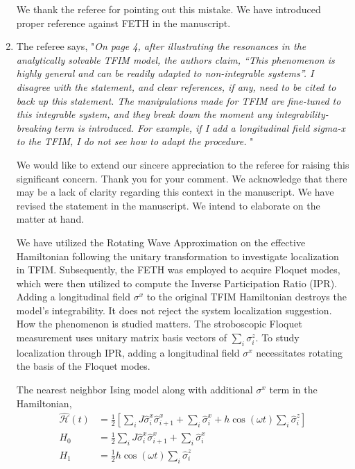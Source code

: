 \documentclass[aps,prb,reprint,showpacs,floatfix,superscriptaddress, onecolumn, nofootinbib, 9pt]{revtex4-2}
\newcommand{\response}[1]{{\color{blue}#1}} %
\begin{document}
\begin{enumerate}
\response{
We thank the referee for pointing out this mistake. We have introduced proper reference against FETH in the manuscript.
}

\item The referee says, "\textit{On page 4, after illustrating the resonances in the analytically solvable TFIM model, the authors claim, “This phenomenon is highly general and can be readily adapted to non-integrable systems”. I disagree with the statement, and clear references, if any, need to be cited to back up this statement. The manipulations made for TFIM are fine-tuned to this integrable system, and they break down the moment any integrability-breaking term is introduced. For example, if I add a longitudinal field sigma-x to the TFIM, I do not see how to adapt the procedure. }"\\

\response{ We would like to extend our sincere appreciation to the referee for raising this significant concern. Thank you for your comment. We acknowledge that there may be a lack of clarity regarding this context in the manuscript. We have revised the statement in the manuscript. We intend to elaborate on the matter at hand.

We have utilized the Rotating Wave Approximation on the effective Hamiltonian following the unitary transformation to investigate localization in TFIM. Subsequently, the FETH was employed to acquire Floquet modes, which were then utilized to compute the Inverse Participation Ratio (IPR). Adding a longitudinal field $\sigma^x$ to the original TFIM Hamiltonian destroys the model's integrability. It does not reject the system localization suggestion. How the phenomenon is studied matters. The stroboscopic Floquet measurement uses unitary matrix basis vectors of $\sum_i\sigma^z_i$. To study localization through IPR, adding a longitudinal field $\sigma^x$ necessitates rotating the basis of the Floquet modes. 

The nearest neighbor Ising model along with additional $\sigma^x$ term in the Hamiltonian,
\begin{align}
	\hat{\mathcal{H}}(t) & =\frac{1}{2}\left[\sum_{i} J \hat{\sigma}_{i}^{x} \hat{\sigma}_{i+1}^{x}+\sum_{i} \hat{\sigma}_{i}^{x}+h \cos (\omega t) \sum_{i} \hat{\sigma}_{i}^{z}\right]\\
	H_{0} & =\frac{1}{2} \sum_{i} J \hat{\sigma}_{i}^{x} \hat{\sigma}_{i+1}^{x}+\sum_{i} \hat{\sigma}_{i}^{x} \nonumber\\
	H_{1} & =\frac{1}{2} h \cos (\omega t) \sum_{i} \hat{\sigma}_{i}^{z}\nonumber
\end{align}

}
\end{enumerate}
\end{document}
